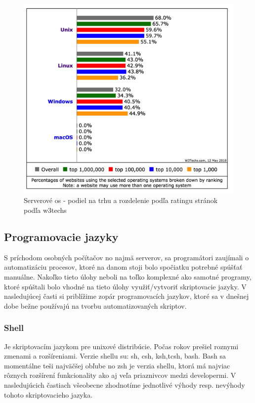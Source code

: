\begin{figure}[!htbp]
	\centering
	\includegraphics[scale=0.4]{img/usage_grou_by_os_sites.png}
	\caption{Serverové \gls{os} - podiel na trhu a rozdelenie podľa ratingu stránok podľa w3techs\cite{pop}}
	\label{fig:test}
	
\end{figure}

\subsection{Programovacie jazyky}
\indent S príchodom osobných počítačov no najmä serverov, sa programátori zaujímali o automatizáciu procesov, ktoré na danom stoji bolo spočiatku potrebné spúšťať manuálne. Nakoľko tieto úlohy neboli na toľko komplexné ako samotné programy, ktoré spúštali bolo vhodné na tieto úlohy využiť/vytvoriť skriptovacie jazyky. V nasledujúcej časti si priblížime zopár programovacích jazykov, ktoré sa v dnešnej dobe bežne používajú na tvorbu automatizovaných skriptov.

\subsubsection{Shell}
\indent
Je skriptovacím jazykom pre unixové distribúcie. Počas rokov prešiel roznymi zmenami a rozšíreniami. Verzie shellu su: sh, csh, ksh,tcsh, bash. Bash sa momentálne teši najväčšej obľube no zsh je verzia shellu, ktorá má najviac rôznych rozšírení funkcionality ako aj veľa priaznivcov medzi developermi. V nasledujúcich častiach všeobecne zhodnotíme jednotlivé výhody resp. nevýhody tohoto skriptovacieho jazyka.

